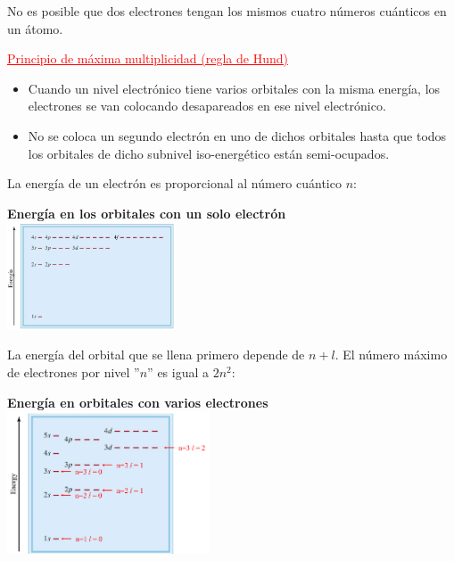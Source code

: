        \indent No es posible que dos electrones tengan los mismos cuatro números cuánticos en un átomo.
        
        \begin{center} \textcolor{red}{\underline{Principio de máxima multiplicidad (regla de Hund)}} \end{center}

        \begin{itemize} 
            \item Cuando un nivel electrónico tiene varios orbitales con la misma energía, los electrones se van colocando desapareados en ese nivel electrónico.
            \item No se coloca un segundo electrón en uno de dichos orbitales hasta que todos los orbitales de dicho subnivel iso-energético están semi-ocupados.
        \end{itemize}

        \indent La energía de un electrón es proporcional al número cuántico $n$:
        \begin{center} 
            \textbf{Energía en los orbitales con un solo electrón} \\[5pt]
            \includegraphics[width=5cm]{./imagenes/orbitalesEnergia.png}
        \end{center}

        \indent La energía del orbital que se llena primero depende de $n + l$. El número máximo de electrones por nivel ''$n$'' es igual a $2n^2$:
        
        \begin{center} \textbf{Energía en orbitales con varios electrones} \\[5pt] \includegraphics[width=6cm]{./imagenes/energiaOrbitalesConVariosElectrones.png} \end{center}

